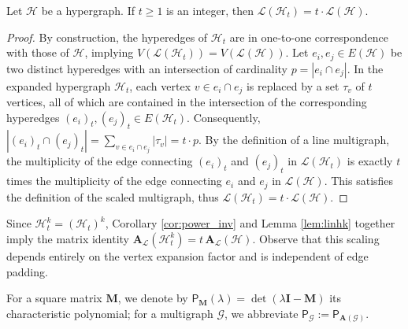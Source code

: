 \documentclass[12pt,reqno]{amsart}
\begin{document}
\begin{lemma}\label{lem:linhk}
	Let $\mathcal{H}$ be a hypergraph. If $t \geq 1$ is an integer, then $\mathcal{L}(\mathcal{H}_t) = t \cdot \mathcal{L}(\mathcal{H})$.
\end{lemma}
\begin{proof}
By construction, the hyperedges of $\mathcal{H}_t$ are in one-to-one correspondence with those of $\mathcal{H}$, implying $V(\mathcal{L}(\mathcal{H}_t)) = V(\mathcal{L}(\mathcal{H}))$. Let $e_i, e_j \in E(\mathcal{H})$ be two distinct hyperedges with an intersection of cardinality $p = |e_i \cap e_j|$. In the expanded hypergraph $\mathcal{H}_t$, each vertex $v \in e_i \cap e_j$ is replaced by a set $\tau_v$ of $t$ vertices, all of which are contained in the intersection of the corresponding hyperedges $(e_i)_t, (e_j)_t \in E(\mathcal{H}_t)$. Consequently, $|(e_i)_t \cap (e_j)_t| = \sum_{v \in e_i \cap e_j} |\tau_v| = t \cdot p$. By the definition of a line multigraph, the multiplicity of the edge connecting $(e_i)_t$ and $(e_j)_t$ in $\mathcal{L}(\mathcal{H}_t)$ is exactly $t$ times the multiplicity of the edge connecting $e_i$ and $e_j$ in $\mathcal{L}(\mathcal{H})$. This satisfies the definition of the scaled multigraph, thus $\mathcal{L}(\mathcal{H}_t) = t \cdot \mathcal{L}(\mathcal{H})$.\end{proof}

\begin{remark}\label{rem:scal-matrix}
Since $\mathcal{H}^k_t = (\mathcal{H}_t)^k$, Corollary \ref{cor:power_inv} and Lemma \ref{lem:linhk} together imply the matrix identity $\mathbf{A}_{\mathcal{L}}(\mathcal{H}^k_t) = t\,\mathbf{A}_{\mathcal{L}}(\mathcal{H})$. Observe that this scaling depends entirely on the vertex expansion factor and is independent of edge padding.
\end{remark}

For a square matrix $\mathbf{M}$, we denote by $\mathsf{P}_{\mathbf{M}}(\lambda) = \det(\lambda\mathbf{I} - \mathbf{M})$ its characteristic polynomial; for a multigraph $\mathcal{G}$, we abbreviate $\mathsf{P}_{\mathcal{G}} := \mathsf{P}_{\mathbf{A}(\mathcal{G})}$.
\end{document}
